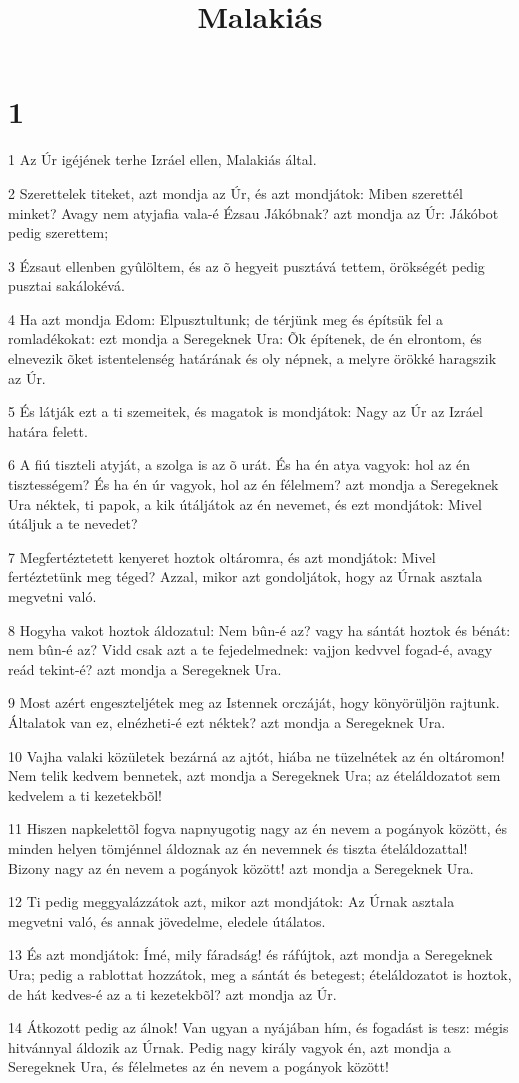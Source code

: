 

\title{Malakiás}


\chapter{1}

\par 1 Az Úr igéjének terhe Izráel ellen, Malakiás által.
\par 2 Szerettelek titeket, azt mondja az Úr, és azt mondjátok: Miben szerettél minket? Avagy nem atyjafia vala-é Ézsau Jákóbnak? azt mondja az Úr: Jákóbot pedig szerettem;
\par 3 Ézsaut ellenben gyûlöltem, és az õ hegyeit pusztává tettem, örökségét pedig pusztai sakálokévá.
\par 4 Ha azt mondja Edom: Elpusztultunk; de térjünk meg és építsük fel a romladékokat: ezt mondja a Seregeknek Ura: Õk építenek, de én elrontom, és elnevezik õket istentelenség határának és oly népnek, a melyre örökké haragszik az Úr.
\par 5 És látják ezt a ti szemeitek, és magatok is mondjátok: Nagy az Úr az Izráel határa felett.
\par 6 A fiú tiszteli atyját, a szolga is az õ urát. És ha én atya vagyok: hol az én tisztességem? És ha én úr vagyok, hol az én félelmem? azt mondja a Seregeknek Ura néktek, ti papok, a kik útáljátok az én nevemet, és ezt mondjátok: Mivel útáljuk a te nevedet?
\par 7 Megfertéztetett kenyeret hoztok oltáromra, és azt mondjátok: Mivel fertéztetünk meg téged? Azzal, mikor azt gondoljátok, hogy az Úrnak asztala megvetni való.
\par 8 Hogyha vakot hoztok áldozatul: Nem bûn-é az? vagy ha sántát hoztok és bénát: nem bûn-é az? Vidd csak azt a te fejedelmednek: vajjon kedvvel fogad-é, avagy reád tekint-é? azt mondja a Seregeknek Ura.
\par 9 Most azért engeszteljétek meg az Istennek orczáját, hogy könyörüljön rajtunk. Általatok van ez, elnézheti-é ezt néktek? azt mondja a Seregeknek Ura.
\par 10 Vajha valaki közületek bezárná az ajtót, hiába ne tüzelnétek az én oltáromon! Nem telik kedvem bennetek, azt mondja a Seregeknek Ura; az ételáldozatot sem kedvelem a ti kezetekbõl!
\par 11 Hiszen napkelettõl fogva napnyugotig nagy az én nevem a pogányok között, és minden helyen tömjénnel áldoznak az én nevemnek és tiszta ételáldozattal! Bizony nagy az én nevem a pogányok között! azt mondja a Seregeknek Ura.
\par 12 Ti pedig meggyalázzátok azt, mikor azt mondjátok: Az Úrnak asztala megvetni való, és annak jövedelme, eledele útálatos.
\par 13 És azt mondjátok: Ímé, mily fáradság! és ráfújtok, azt mondja a Seregeknek Ura; pedig a rablottat hozzátok, meg a sántát és betegest; ételáldozatot is hoztok, de hát kedves-é az a ti kezetekbõl? azt mondja az Úr.
\par 14 Átkozott pedig az álnok! Van ugyan a nyájában hím, és fogadást is tesz: mégis hitvánnyal áldozik az Úrnak. Pedig nagy király vagyok én, azt mondja a Seregeknek Ura, és félelmetes az én nevem a pogányok között!

